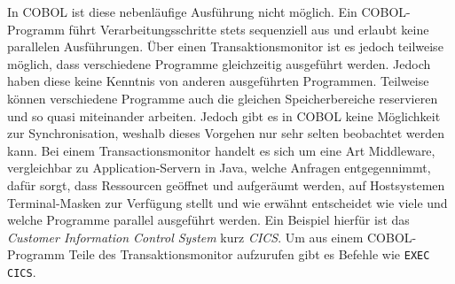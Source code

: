 In COBOL ist diese nebenläufige Ausführung nicht möglich. Ein COBOL-Programm führt Verarbeitungsschritte stets sequenziell aus und erlaubt keine parallelen Ausführungen. Über einen Transaktionsmonitor ist es jedoch teilweise möglich, dass verschiedene Programme gleichzeitig ausgeführt werden. Jedoch haben diese keine Kenntnis von anderen ausgeführten Programmen. Teilweise können verschiedene Programme auch die gleichen Speicherbereiche reservieren und so quasi miteinander arbeiten. Jedoch gibt es in COBOL keine Möglichkeit zur Synchronisation, weshalb dieses Vorgehen nur sehr selten beobachtet werden kann. Bei einem Transactionsmonitor handelt es sich um eine Art Middleware, vergleichbar zu Application-Servern in Java, welche Anfragen entgegennimmt, dafür sorgt, dass Ressourcen geöffnet und aufgeräumt werden, auf Hostsystemen Terminal-Masken zur Verfügung stellt und wie erwähnt entscheidet wie viele und welche Programme parallel ausgeführt werden. Ein Beispiel hierfür ist das \textit{Customer Information Control System} kurz \textit{CICS}. Um aus einem COBOL-Programm Teile des Transaktionsmonitor aufzurufen gibt es Befehle wie \texttt{EXEC CICS}. 
